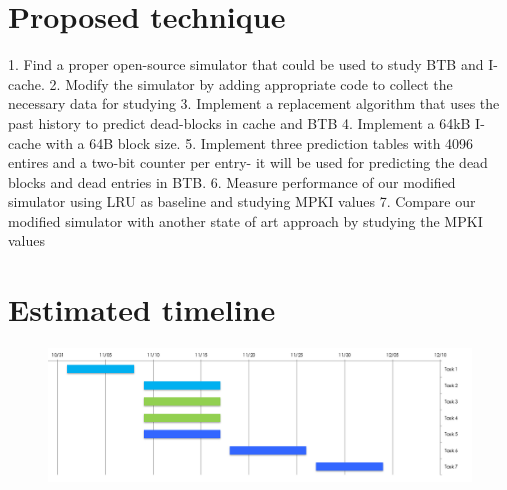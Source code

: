 \documentclass[11pt]{article}
\begin{document}
\section{Proposed technique}
\label{sec:proposed}
1.	Find a proper open-source simulator that could be used to study BTB and I-cache.
2.	Modify the simulator by adding appropriate code to collect the necessary data for studying
3.	Implement a replacement algorithm that uses the past history to predict dead-blocks in cache and BTB
4.	Implement a 64kB I-cache with a 64B block size.
5.	Implement three prediction tables with 4096 entires and a two-bit counter per entry- it will be used for predicting the dead blocks and dead entries in BTB.
6.	Measure performance of our modified simulator using LRU as baseline and studying MPKI values
7.	Compare our modified simulator with another state of art approach by studying the MPKI values


\section{Estimated timeline}
\begin{figure}[h]
	\includegraphics[width=1\textwidth]{Timeline.PNG}
\end{figure}
\label{sec:timeline}




{%
	
	
	}
\end{document}
